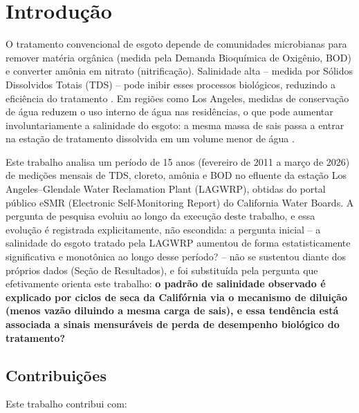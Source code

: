 \section{Introdução}

O tratamento convencional de esgoto depende de comunidades microbianas para remover matéria orgânica (medida pela Demanda Bioquímica de Oxigênio, BOD) e converter amônia em nitrato (nitrificação). Salinidade alta -- medida por Sólidos Dissolvidos Totais (TDS) -- pode inibir esses processos biológicos, reduzindo a eficiência do tratamento \cite{schwabe2020unintended}. Em regiões como Los Angeles, medidas de conservação de água reduzem o uso interno de água nas residências, o que pode aumentar involuntariamente a salinidade do esgoto: a mesma massa de sais passa a entrar na estação de tratamento dissolvida em um volume menor de água \cite{schwabe2020unintended}.

Este trabalho analisa um período de 15 anos (fevereiro de 2011 a março de 2026) de medições mensais de TDS, cloreto, amônia e BOD no efluente da estação Los Angeles--Glendale Water Reclamation Plant (LAGWRP), obtidas do portal público eSMR (Electronic Self-Monitoring Report) do California Water Boards. A pergunta de pesquisa evoluiu ao longo da execução deste trabalho, e essa evolução é registrada explicitamente, não escondida: a pergunta inicial -- a salinidade do esgoto tratado pela LAGWRP aumentou de forma estatisticamente significativa e monotônica ao longo desse período? -- não se sustentou diante dos próprios dados (Seção de Resultados), e foi substituída pela pergunta que efetivamente orienta este trabalho: \textbf{o padrão de salinidade observado é explicado por ciclos de seca da Califórnia via o mecanismo de diluição (menos vazão diluindo a mesma carga de sais), e essa tendência está associada a sinais mensuráveis de perda de desempenho biológico do tratamento?}

\subsection{Contribuições}

Este trabalho contribui com:

